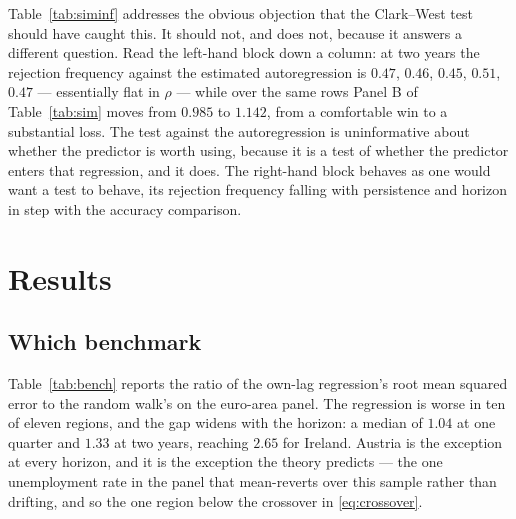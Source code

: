 \documentclass[12pt]{article}
\begin{document}
Table~\ref{tab:siminf} addresses the obvious objection that the Clark--West
test should have caught this. It should not, and does not, because it answers a
different question. Read the left-hand block down a column: at two years the
rejection frequency against the estimated autoregression is $0.47$, $0.46$,
$0.45$, $0.51$, $0.47$ --- essentially flat in $\rho$ --- while over the same
rows Panel B of Table~\ref{tab:sim} moves from $0.985$ to $1.142$, from a
comfortable win to a substantial loss. The test against the autoregression is
uninformative about whether the predictor is worth using, because it is a test
of whether the predictor enters that regression, and it does. The right-hand
block behaves as one would want a test to behave, its rejection frequency
falling with persistence and horizon in step with the accuracy comparison.

\section{Results}

\subsection{Which benchmark}

Table~\ref{tab:bench} reports the ratio of the own-lag regression's root mean
squared error to the random walk's on the euro-area panel. The regression is
worse in ten of eleven regions, and the gap widens with the horizon: a median
of $1.04$ at one quarter and $1.33$ at two years, reaching $2.65$ for Ireland.
Austria is the exception at every horizon, and it is the exception the theory
predicts --- the one unemployment rate in the panel that mean-reverts over this
sample rather than drifting, and so the one region below the crossover in
\eqref{eq:crossover}.
\end{document}
